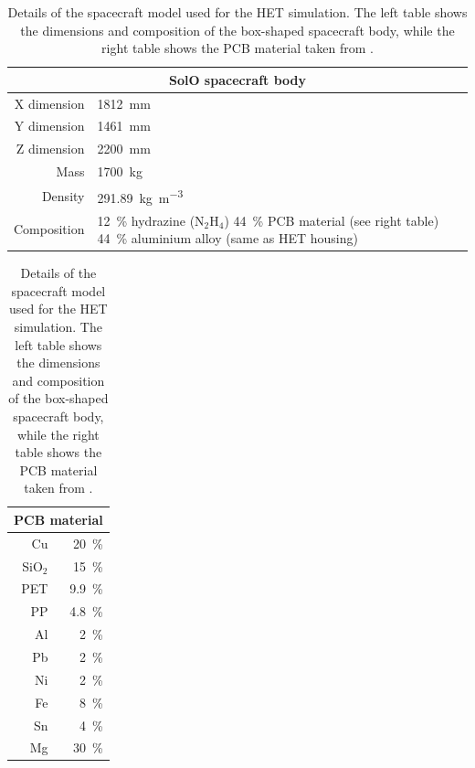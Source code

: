 \begin{table}
    \begin{tabular}{rp{6cm}}
        \toprule
        \multicolumn{2}{c}{\textbf{SolO spacecraft body}}                   \\
        \midrule
        X dimension & \SI{1812}{\milli\meter}                \\
        Y dimension & \SI{1461}{\milli\meter}                \\
        Z dimension & \SI{2200}{\milli\meter}                \\
        Mass        & \SI{1700}{\kilogram}                   \\
        Density     & \SI{291.89}{\kilogram\per\cubic\meter} \\
        Composition & \SI{12}{\percent} hydrazine (N$_2$H$_4$) \newline \SI{44}{\percent} \ac{PCB} material (see right table) \newline \SI{44}{\percent} aluminium alloy (same as \ac{HET} housing) \\
        \bottomrule
    \end{tabular}
    \hspace{1cm}
    \begin{tabular}{rr}
    	\toprule
    	\multicolumn{2}{c}{\textbf{\ac{PCB} material}} \\ \midrule
    	Cu      & \SI{20}{\percent}     \\
    	SiO$_2$ & \SI{15}{\percent}     \\
    	PET     & \SI{9.9}{\percent}    \\
    	PP      & \SI{4.8}{\percent}    \\
    	Al      & \SI{2}{\percent}      \\
    	Pb      & \SI{2}{\percent}      \\
    	Ni      & \SI{2}{\percent}      \\
    	Fe      & \SI{8}{\percent}      \\
    	Sn      & \SI{4}{\percent}      \\
    	Mg      & \SI{30}{\percent}     \\ \bottomrule
    \end{tabular}
    \caption[Details of the spacecraft model used for the \acs{HET} simulation]{Details of the spacecraft model used for the \ac{HET} simulation. The left table shows the dimensions and composition of the box-shaped spacecraft body, while the right table shows the \ac{PCB} material taken from \citet{Appel-2018,Appel-2018-PhD}.}
    \label{tab:solo_spacecraft_gdml}
\end{table}

